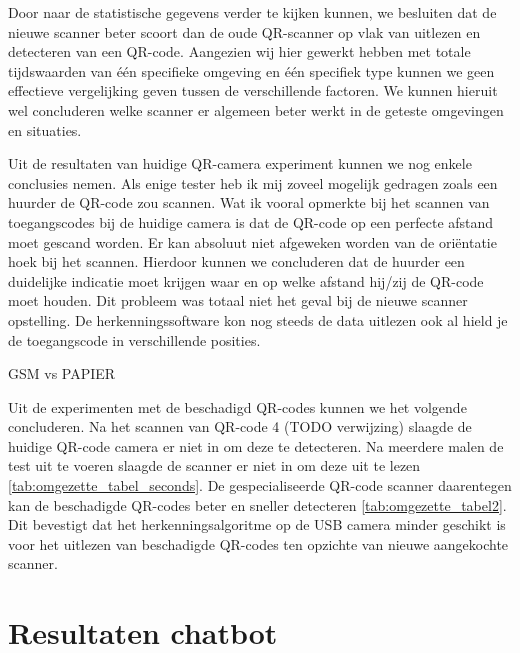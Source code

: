     
Door naar de statistische gegevens verder te kijken kunnen, we besluiten dat de nieuwe scanner beter scoort dan de oude QR-scanner op vlak van uitlezen en detecteren van een QR-code. Aangezien wij hier gewerkt hebben met totale tijdswaarden van één specifieke omgeving en één specifiek type kunnen we geen effectieve vergelijking geven tussen de verschillende factoren. We kunnen hieruit wel concluderen welke scanner er algemeen beter werkt in de geteste omgevingen en situaties.

Uit de resultaten van huidige QR-camera experiment kunnen we nog enkele conclusies nemen. Als enige tester heb ik mij zoveel mogelijk gedragen zoals een huurder de QR-code zou scannen. Wat ik vooral opmerkte bij het scannen van toegangscodes bij de huidige camera is dat de QR-code op een perfecte afstand moet gescand worden. Er kan absoluut niet afgeweken worden van de oriëntatie hoek bij het scannen. Hierdoor kunnen we concluderen dat de huurder een duidelijke indicatie moet krijgen waar en op welke afstand hij/zij de QR-code moet houden. Dit probleem was totaal niet het geval bij de nieuwe scanner opstelling. De herkenningssoftware kon nog steeds de data uitlezen ook al hield je de toegangscode in verschillende posities.

GSM vs PAPIER


Uit de experimenten met de beschadigd QR-codes kunnen we het volgende concluderen. Na het scannen van QR-code 4 (TODO verwijzing) slaagde de huidige QR-code camera er niet in om deze te detecteren. Na meerdere malen de test uit te voeren slaagde de scanner er niet in om deze uit te lezen \ref{tab:omgezette_tabel_seconds}. De gespecialiseerde QR-code scanner daarentegen kan de beschadigde QR-codes beter en sneller detecteren \ref{tab:omgezette_tabel2}. Dit bevestigt dat het herkenningsalgoritme op de USB camera minder geschikt is voor het uitlezen van beschadigde QR-codes ten opzichte van nieuwe aangekochte scanner.
    
\section{Resultaten chatbot}
\label{sec:resultatenChatbot}

